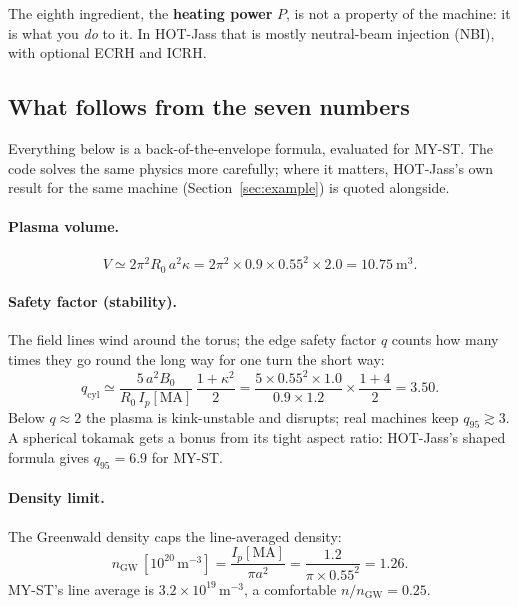 \documentclass[11pt,a4paper]{article}
\begin{document}
The eighth ingredient, the \textbf{heating power} $P$, is not a property of the
machine: it is what you \emph{do} to it. In HOT-Jass that is mostly neutral-beam
injection (NBI), with optional ECRH and ICRH.

\subsection{What follows from the seven numbers}

Everything below is a back-of-the-envelope formula, evaluated for MY-ST. The
code solves the same physics more carefully; where it matters, HOT-Jass's own
result for the same machine (Section~\ref{sec:example}) is quoted alongside.

\paragraph{Plasma volume.}
\[
  V \simeq 2\pi^2 R_0\, a^2 \kappa = 2\pi^2 \times 0.9 \times 0.55^2 \times 2.0
  = 10.75~\mathrm{m^3}.
\]

\paragraph{Safety factor (stability).}
The field lines wind around the torus; the edge safety factor $q$ counts how
many times they go round the long way for one turn the short way:
\[
  q_{\mathrm{cyl}} \simeq \frac{5\,a^2 B_0}{R_0\, I_p[\mathrm{MA}]}\,\frac{1+\kappa^2}{2}
  = \frac{5 \times 0.55^2 \times 1.0}{0.9 \times 1.2}\times\frac{1+4}{2} = 3.50 .
\]
Below $q\approx 2$ the plasma is kink-unstable and disrupts; real machines keep
$q_{95}\gtrsim 3$. A spherical tokamak gets a bonus from its tight aspect
ratio: HOT-Jass's shaped formula gives $q_{95}=6.9$ for MY-ST.

\paragraph{Density limit.}
The Greenwald density caps the line-averaged density:
\[
  n_{\mathrm{GW}}\,[10^{20}\,\mathrm{m^{-3}}] = \frac{I_p[\mathrm{MA}]}{\pi a^2}
  = \frac{1.2}{\pi\times0.55^2} = 1.26 .
\]
MY-ST's line average is $3.2\times10^{19}\,\mathrm{m^{-3}}$, a comfortable
$n/n_{\mathrm{GW}}=0.25$.
\end{document}
